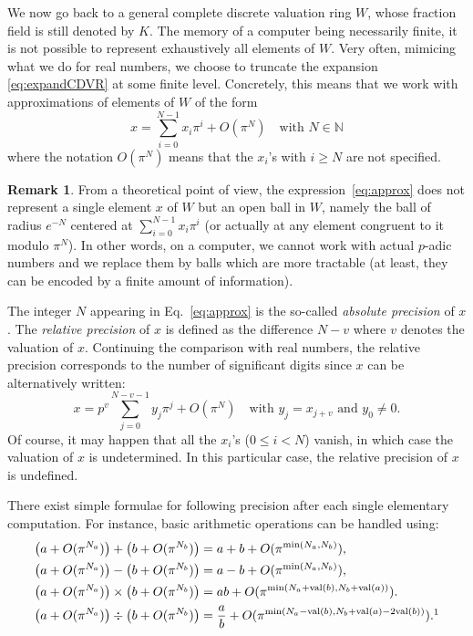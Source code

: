 \documentclass{jT}
\numberwithin{equation}{section}
\DeclareMathOperator{\val}{val}
\theoremstyle{definition}
\newtheorem{rem}[theo]{Remark}
\newcommand{\N}{\mathbb N}
\renewcommand{\min}{\text{\rm min}}
\renewcommand{\val}{\text{\rm val}}
\newcommand{\A}{W}
\begin{document}
We now go back to a general complete discrete valuation ring $\A$, 
whose fraction field is still denoted by $K$.
The memory of a computer being necessarily finite, it is not possible to 
represent exhaustively all elements of $\A$. Very often, mimicing 
what we do for real numbers, we choose to truncate the expansion 
\eqref{eq:expandCDVR} at some finite level. Concretely, this means 
that we work with approximations of elements of $\A$ of the form
\begin{equation}
\label{eq:approx}
x = \sum_{i=0}^{N-1} x_i \pi^i + O(\pi^N) \quad \text{with } N \in \N
\end{equation}
where the notation $O(\pi^N)$ means that the $x_i$'s with $i \geq N$ are 
not specified.

\begin{rem}
\label{rem:balls}
From a theoretical point of view, the expression~\eqref{eq:approx}
does not represent a single element $x$ of $\A$ but an open ball in
$\A$, namely the ball of radius $e^{-N}$ centered at $\sum_{i=0}^{N-1} 
x_i \pi^i$ (or actually at any element congruent to it modulo $\pi^N$).
In other words, on a computer, we cannot work with actual $p$-adic
numbers and we replace them by balls which are more tractable (at
least, they can be encoded by a finite amount of information).
\end{rem}

The integer $N$ appearing in Eq.~\eqref{eq:approx} is the so-called 
\emph{absolute precision} of $x$. The \emph{relative precision} of $x$ 
is defined as the difference $N-v$ where $v$ denotes the valuation of 
$x$. Continuing the comparison with real numbers, the relative precision 
corresponds to the number of significant digits since $x$ can be 
alternatively written:
$$x = p^v \sum_{j=0}^{N-v-1} y_j \pi^j + O(\pi^N)
\quad \text{with } y_j = x_{j+v} \text{ and } y_0 \neq 0.$$
Of course, it may happen that all the $x_i$'s ($0 \leq i < N$) vanish,
in which case the valuation of $x$ is undetermined. In this particular
case, the relative precision of $x$ is undefined.

There exist simple formulae for following precision after each single
elementary computation. For instance, basic arithmetic operations can
be handled using:
\begin{align}
\big(a + O(\pi^{N_a})\big) + \big(b + O(\pi^{N_b})\big) 
& = a + b + O(\pi^{\min(N_a,N_b)}), 
\label{eq:precadd} \\
\big(a + O(\pi^{N_a})\big) - \big(b + O(\pi^{N_b})\big) 
& = a - b + O(\pi^{\min(N_a,N_b)}), 
\label{eq:precsub} \\
\big(a + O(\pi^{N_a})\big) \times \big(b + O(\pi^{N_b})\big) 
& = ab + O(\pi^{\min(N_a + \val(b), N_b + \val(a))}).
\label{eq:precmul} \\
\big(a + O(\pi^{N_a})\big) \div \big(b + O(\pi^{N_b})\big) 
& = \frac a b + O(\pi^{\min(N_a - \val(b), N_b + \val(a) - 2 \val(b))}).\footnotemark
\label{eq:precdiv} 
\end{align}
\end{document}
